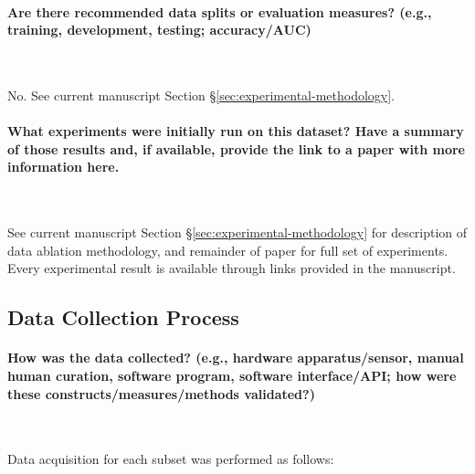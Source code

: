 \paragraph{Are there recommended data splits or evaluation measures? (e.g., training, development, testing; accuracy/AUC)}~

No. 
See current manuscript Section \S\ref{sec:experimental-methodology}.

\paragraph{What experiments were initially run on this dataset? Have a summary of those results and, if available, provide the link to a paper with more information here.}~

See current manuscript Section \S\ref{sec:experimental-methodology} for description of data ablation methodology, and remainder of paper for full set of experiments. 
Every experimental result is available through links provided in the manuscript.

\subsection{Data Collection Process}
\label{datasheet:collection}

\paragraph{How was the data collected? (e.g., hardware apparatus/sensor, manual human curation, software program, software interface/API; how were these constructs/measures/methods validated?)}~

Data acquisition for each subset was performed as follows:

